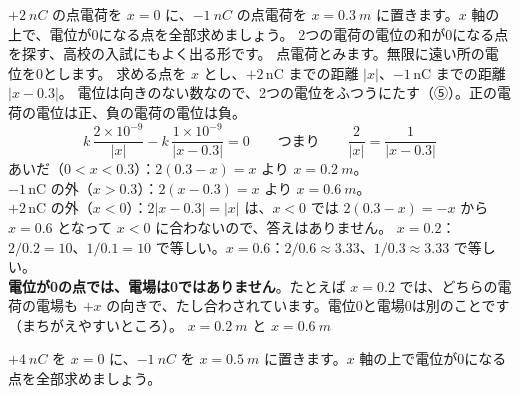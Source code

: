 \label{ph:電-2:ex8}
\begin{phreidai}
$+\qty{2}{nC}$ の点電荷を $x=0$ に、$-\qty{1}{nC}$ の点電荷を $x=\qty{0.3}{m}$ に置きます。$x$ 軸の上で、電位が0になる点を全部求めましょう。
\phbamen
2つの電荷の電位の和が0になる点を探す、高校の入試にもよく出る形です。
\phmushi
点電荷とみます。無限に遠い所の電位を0とします。
\phzu
求める点を $x$ とし、$+2$\,nC までの距離 $|x|$、$-1$\,nC までの距離 $|x-0.3|$。
\phriyu
電位は向きのない数なので、2つの電位をふつうにたす（⑤）。正の電荷の電位は正、負の電荷の電位は負。
\phtateru
\[k\,\frac{2\times10^{-9}}{|x|}-k\,\frac{1\times10^{-9}}{|x-0.3|}=0\qquad\text{つまり}\qquad\frac{2}{|x|}=\frac{1}{|x-0.3|}\]
\phtoku
あいだ（$0<x<0.3$）：$2(0.3-x)=x$ より $x=\qty{0.2}{m}$。\\
$-1$\,nC の外（$x>0.3$）：$2(x-0.3)=x$ より $x=\qty{0.6}{m}$。\\
$+2$\,nC の外（$x<0$）：$2|x-0.3|=|x|$ は、$x<0$ では $2(0.3-x)=-x$ から $x=0.6$ となって $x<0$ に合わないので、答えはありません。
\phtashikame
$x=0.2$：$2/0.2=10$、$1/0.1=10$ で等しい。$x=0.6$：$2/0.6\approx3.33$、$1/0.3\approx3.33$ で等しい。\\
\textbf{電位が0の点では、電場は0ではありません}。たとえば $x=0.2$ では、どちらの電荷の電場も $+x$ の向きで、たし合わされています。電位0と電場0は別のことです（まちがえやすいところ）。
\kotae $x=\qty{0.2}{m}$ と $x=\qty{0.6}{m}$
\end{phreidai}
\begin{jibun}
$+\qty{4}{nC}$ を $x=0$ に、$-\qty{1}{nC}$ を $x=\qty{0.5}{m}$ に置きます。$x$ 軸の上で電位が0になる点を全部求めましょう。
\end{jibun}

